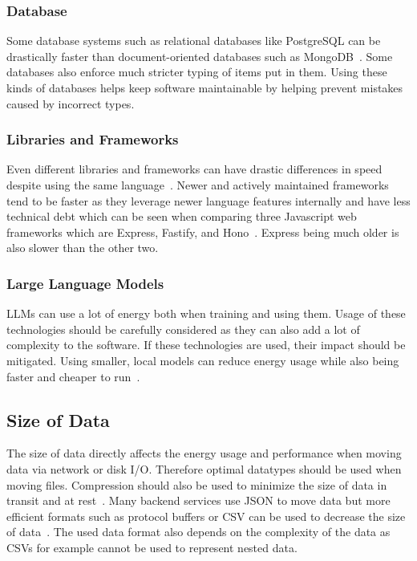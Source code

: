 \subsubsection{Database}
 Some database systems such as relational databases like PostgreSQL can be drastically faster than document-oriented databases such as MongoDB~\cite{mongodbpostgresql}. Some databases also enforce much stricter typing of items put in them. Using these kinds of databases helps keep software maintainable by helping prevent mistakes caused by incorrect types.
 
\subsubsection{Libraries and Frameworks}
Even different libraries and frameworks can have drastic differences in speed despite using the same language~\cite{investigatingtheimpactofweb}. Newer and actively maintained frameworks tend to be faster as they leverage newer language features internally and have less technical debt which can be seen when comparing three Javascript web frameworks which are Express, Fastify, and Hono~\cite{webframeworksbenchmarkFrameworksBenchmark}. Express being much older is also slower than the other two.

\subsubsection{Large Language Models}\label{llm}
LLMs can use a lot of energy both when training and using them. Usage of these technologies should be carefully considered as they can also add a lot of complexity to the software. If these technologies are used, their impact should be mitigated. Using smaller, local models can reduce energy usage while also being faster and cheaper to run~\cite{greensoftwareGreenSoftware}.

\subsection{Size of Data}
The size of data directly affects the energy usage and performance when moving data via network or disk I/O. Therefore optimal datatypes should be used when moving files. Compression should also be used to minimize the size of data in transit and at rest~\cite{greensoftwareGreenSoftware}. Many backend services use JSON to move data but more efficient formats such as protocol buffers or CSV can be used to decrease the size of data~\cite{guidelines}. The used data format also depends on the complexity of the data as CSVs for example cannot be used to represent nested data.

